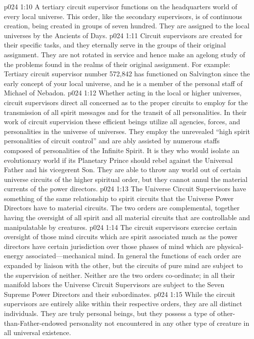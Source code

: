 \vs p024 1:10 A tertiary circuit supervisor functions on the headquarters world of every local universe. This order, like the secondary supervisors, is of continuous creation, being created in groups of seven hundred. They are assigned to the local universes by the Ancients of Days.
\vs p024 1:11 Circuit supervisors are created for their specific tasks, and they eternally serve in the groups of their original assignment. They are not rotated in service and hence make an agelong study of the problems found in the realms of their original assignment. For example: Tertiary circuit supervisor number 572,842 has functioned on Salvington since the early concept of your local universe, and he is a member of the personal staff of Michael of Nebadon.
\pc \vs p024 1:12 Whether acting in the local or higher universes, circuit supervisors direct all concerned as to the proper circuits to employ for the transmission of all spirit messages and for the transit of all personalities. In their work of circuit supervision these efficient beings utilize all agencies, forces, and personalities in the universe of universes. They employ the unrevealed “high spirit personalities of circuit control” and are ably assisted by numerous staffs composed of personalities of the Infinite Spirit. It is they who would isolate an evolutionary world if its Planetary Prince should rebel against the Universal Father and his vicegerent Son. They are able to throw any world out of certain universe circuits of the higher spiritual order, but they cannot annul the material currents of the power directors.
\pc \vs p024 1:13 The Universe Circuit Supervisors have something of the same relationship to spirit circuits that the Universe Power Directors have to material circuits. The two orders are complemental, together having the oversight of all spirit and all material circuits that are controllable and manipulatable by creatures.\plusone
\vs p024 1:14 The circuit supervisors exercise certain oversight of those mind circuits which are spirit associated much as the power directors have certain jurisdiction over those phases of mind which are physical\hyp{}energy associated---mechanical mind. In general the functions of each order are expanded by liaison with the other, but the circuits of pure mind are subject to the supervision of neither. Neither are the two orders co\hyp{}ordinate; in all their manifold labors the Universe Circuit Supervisors are subject to the Seven Supreme Power Directors and their subordinates.\plusone
\pc \vs p024 1:15 While the circuit supervisors are entirely alike within their respective orders, they are all distinct individuals. They are truly personal beings, but they possess a type of other\hyp{}than\hyp{}Father\hyp{}endowed personality not encountered in any other type of creature in all universal existence.

